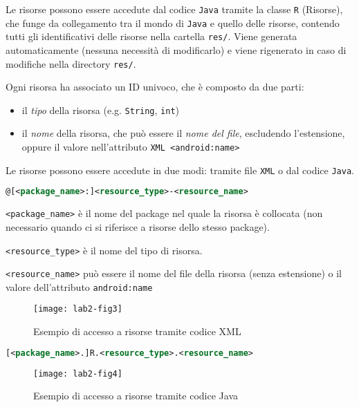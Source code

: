 Le risorse possono essere accedute dal codice \texttt{Java} tramite la classe
\texttt{R} (Risorse), che funge da collegamento tra il mondo di \texttt{Java} e
quello delle risorse, contendo tutti gli identificativi delle risorse nella
cartella \texttt{res/}. Viene generata automaticamente (nessuna necessità di
modificarlo) e viene rigenerato in caso di modifiche nella directory
\texttt{res/}.

Ogni risorsa ha associato un ID univoco, che è composto da due parti:
\begin{itemize}
\item il \textit{tipo} della risorsa (e.g. \texttt{String}, \texttt{int})
\item il \textit{nome} della risorsa, che può essere il \textit{nome del file},
escludendo l'estensione, oppure il valore nell'attributo \texttt{XML
<android:name>}
\end{itemize}

Le risorse possono essere accedute in due modi: tramite file \texttt{XML} o dal
codice \texttt{Java}.



\begin{lstlisting}[language=XML, basicstyle=\footnotesize]
@[<package_name>:]<resource_type>-<resource_name>
\end{lstlisting}

\texttt{<package\_name>} è il nome del package nel quale la risorsa è collocata
(non necessario quando ci si riferisce a risorse dello stesso package).

\texttt{<resource\_type>} è il nome del tipo di risorsa.

\texttt{<resource\_name>} può essere il nome del file della risorsa (senza
estensione) o il valore dell'attributo \texttt{android:name}

\begin{figure}[htbp]
        \centering
        \texttt{[image: lab2-fig3]}
        \caption[Accesso Risorse XML]{Esempio di accesso a risorse tramite
codice XML}\label{img:lab2-fig3}
\end{figure}


\begin{lstlisting}[language=XML, basicstyle=\footnotesize]
[<package_name>.]R.<resource_type>.<resource_name>
\end{lstlisting}

\begin{figure}[htbp]
        \centering
        \texttt{[image: lab2-fig4]}
        \caption[Accesso Risorse Java]{Esempio di accesso a risorse tramite
codice Java}\label{img:lab2-fig4}
\end{figure}

